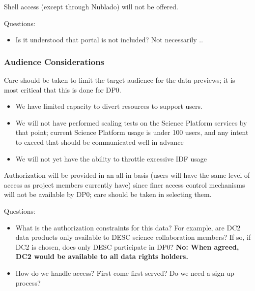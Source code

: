 Shell access (except through Nublado) will not be offered.

Questions:

\begin{itemize}

\item Is it understood that portal is not included? Not necessarily ..

\end{itemize}


\subsubsection{Audience Considerations}

Care should be taken to limit the target audience for the data previews; it is most critical that this is done for DP0.

\begin{itemize}

\item We have limited capacity to divert resources to support users.

\item We will not have performed scaling tests on the Science Platform services by that point; current Science Platform usage is under 100 users, and any intent to exceed that should be communicated well in advance

\item We will not yet have the ability to throttle excessive IDF usage

\end{itemize}

Authorization will be provided in an all-in basis (users will have the same level of access as project members currently have) since finer access control mechanisms will not be available by DP0; care should be taken in selecting them.

Questions:

\begin{itemize}

\item What is the authorization constraints for this data? For example, are DC2 data products only available to DESC science collaboration members? If so, if DC2 is chosen, does only DESC participate in DP0?
	{\bf No: When agreed, DC2 would be available to all data rights holders.}

\item How do we handle access? First come first served? Do we need a sign-up process?

\end{itemize}

